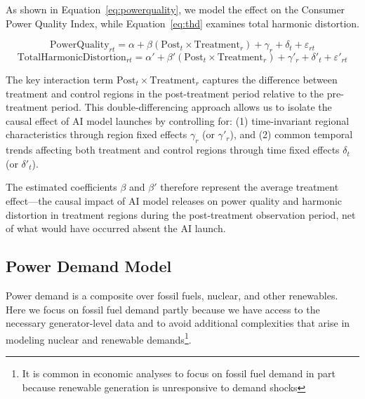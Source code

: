 \documentclass[sigconf,authordraft]{acmart}
\begin{document}
As shown in Equation~\ref{eq:powerquality}, we model the effect on the Consumer Power Quality Index, while Equation~\ref{eq:thd} examines total harmonic distortion. 

\begin{equation}
\text{PowerQuality}_{rt} = \alpha 
+ \beta \left( \text{Post}_{t} \times \text{Treatment}_{r} \right)
+ \gamma_r + \delta_t + \varepsilon_{rt}
\label{eq:powerquality}
\end{equation}
\begin{equation}
\text{TotalHarmonicDistortion}_{rt} = \alpha' 
+ \beta' \left( \text{Post}_{t} \times \text{Treatment}_{r} \right)
+ \gamma'_r + \delta'_t + \varepsilon'_{rt}
\label{eq:thd}
\end{equation}

The key interaction term $\text{Post}_{t} \times \text{Treatment}_{r}$ captures the difference between treatment and control regions in the post-treatment period relative to the pre-treatment period. This double-differencing approach allows us to isolate the causal effect of AI model launches by controlling for: (1) time-invariant regional characteristics through region fixed effects $\gamma_r$ (or $\gamma'_r$), and (2) common temporal trends affecting both treatment and control regions through time fixed effects $\delta_t$ (or $\delta'_t$). 

The estimated coefficients $\beta$ and $\beta'$ therefore represent the average treatment effect---the causal impact of AI model releases on power quality and harmonic distortion in treatment regions during the post-treatment observation period, net of what would have occurred absent the AI launch.



\subsection{Power Demand Model}

Power demand is a composite over fossil fuels, nuclear, and other renewables. Here we focus on fossil fuel demand partly because we have access to the necessary generator-level data and to avoid additional complexities that arise in modeling nuclear and renewable demands\footnote{It is common in economic analyses to focus on fossil fuel demand in part because renewable generation is unresponsive to demand shocks}.%
\end{document}
